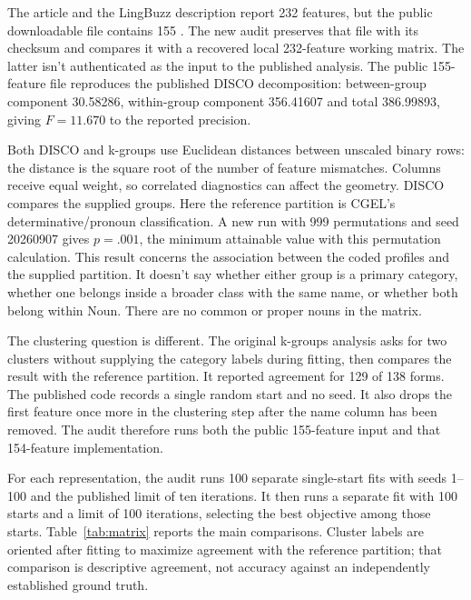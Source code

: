 \documentclass[12pt]{article}
\begin{document}
The article and the LingBuzz description report 232 features, but the public downloadable file contains 155 \citep{reynolds2021matrix}. The new audit preserves that file with its checksum and compares it with a recovered local 232-feature working matrix. The latter isn't authenticated as the input to the published analysis. The public 155-feature file reproduces the published DISCO decomposition: between-group component 30.58286, within-group component 356.41607 and total 386.99893, giving $F=11.670$ to the reported precision.

Both DISCO and k-groups use Euclidean distances between unscaled binary rows: the distance is the square root of the number of feature mismatches. Columns receive equal weight, so correlated diagnostics can affect the geometry. DISCO compares the supplied groups. Here the reference partition is CGEL's determinative/pronoun classification. A new run with 999 permutations and seed 20260907 gives $p=.001$, the minimum attainable value with this permutation calculation. This result concerns the association between the coded profiles and the supplied partition. It doesn't say whether either group is a primary category, whether one belongs inside a broader class with the same name, or whether both belong within Noun. There are no common or proper nouns in the matrix.

The clustering question is different. The original k-groups analysis asks for two clusters without supplying the category labels during fitting, then compares the result with the reference partition. It reported agreement for 129 of 138 forms. The published code records a single random start and no seed. It also drops the first feature once more in the clustering step after the name column has been removed. The audit therefore runs both the public 155-feature input and that 154-feature implementation.

For each representation, the audit runs 100 separate single-start fits with seeds 1--100 and the published limit of ten iterations. It then runs a separate fit with 100 starts and a limit of 100 iterations, selecting the best objective among those starts. Table~\ref{tab:matrix} reports the main comparisons. Cluster labels are oriented after fitting to maximize agreement with the reference partition; that comparison is descriptive agreement, not accuracy against an independently established ground truth.
\end{document}
